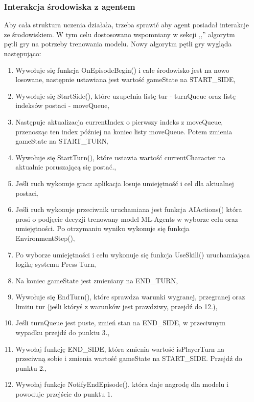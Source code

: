 \documentclass{SGGW-thesis}
\begin{document}
\subsubsection{Interakcja środowiska z agentem}
Aby cała struktura uczenia działała, trzeba sprawić aby agent posiadał interakcje ze środowiskiem. W tym celu dostosowano wspomniany w sekcji ,,'' algorytm pętli gry na potrzeby trenowania modelu.
Nowy algorytm pętli gry wygląda następująco:
\begin{enumerate}
  \item{Wywołuje się funkcja OnEpisodeBegin() i całe środowisko jest na nowo losowane, następnie ustawiana jest wartość gameState na START\_SIDE},
  \item{Wywołuje się StartSide(), które uzupełnia listę tur - turnQueue oraz listę indeksów postaci - moveQueue},
  \item{Następuje aktualizacja currentIndex o pierwszy indeks z moveQueue, przenosząc ten index później na koniec listy moveQueue. Potem zmienia gameState na START\_TURN},
  \item{Wywołuje się StartTurn(), które ustawia wartość currentCharacter na aktualnie poruszającą się postać.},
  \item{Jeśli ruch wykonuje gracz aplikacja losuje umiejętność i cel dla aktualnej postaci},
  \item{Jeśli ruch wykonuje przeciwnik uruchamiana jest funkcja AIActions() która prosi o podjęcie decyzji trenowany model ML-Agents w wyborze celu oraz umiejętności. Po otrzymaniu wyniku wykonuje się funkcja EnvironmentStep()},
  \item{Po wyborze umiejętności i celu wykonuje się funkcja UseSkill() uruchamiająca logikę systemu Press Turn},
  \item{Na koniec gameState jest zmieniany na END\_TURN},
  \item{Wywołuje się EndTurn(), które sprawdza warunki wygranej, przegranej oraz limitu tur (jeśli któryś z warunków jest prawdziwy, przejdź do 12.)},
  \item{Jeśli turnQueue jest puste, zmień stan na END\_SIDE, w przeciwnym wypadku przejdź do punktu 3.},
  \item{Wywołaj funkcję END\_SIDE, która zmienia wartość isPlayerTurn na przeciwną sobie i zmienia wartość gameState na START\_SIDE. Przejdź do punktu 2.},
  \item{Wywołaj funkcje NotifyEndEpisode(), która daje nagrodę dla modelu i powoduje przejście do punktu 1.}
\end{enumerate}
\pagebreak
\end{document}
